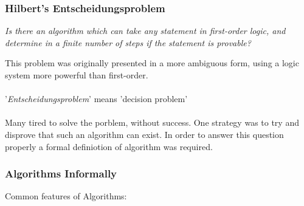 \documentclass{report}
\newcommand{\cenqu}[1]{\begin{center}\textit{#1}\end{center}}
\begin{document}
        \subsubsection*{Hilbert's Entscheidungsproblem}
            \cenqu{Is there an algorithm which can take any statement in first-order logic, and determine in a finite number of steps if the statement is provable?}

            
            This problem was originally presented in a more ambiguous form, using a logic system more powerful than first-order.
            \\
            \\ '\textit{Entscheidungsproblem}' means 'decision problem'
            \\
            \\ Many tired to solve the porblem, without success. One strategy was to try and disprove that such an algorithm can exist. 
            In order to answer this question properly a formal definiotion of algorithm was required.
        
        \subsubsection*{Algorithms Informally}
            Common features of Algorithms:
            \begin{itemize}
            \end{itemize}
\end{document}
